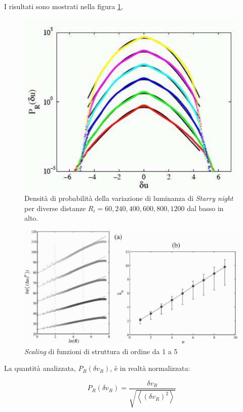 \documentclass[12pt,a4paper]{article}
\numberwithin{equation}{section}
\begin{document}
I risultati sono mostrati nella figura \ref{gaussians}, 

\begin{figure}[h]
    \centering
    \includegraphics[scale=0.5]{gauss.png}
    \caption{Densità di probabilità della variazione di luminanza di \emph{Starry night} per diverse distanze $R_i = 60, 240, 400, 600, 800, 1200$ dal basso in alto.}
    \label{gaussians}
\end{figure}

\begin{figure}
    \centering
    \includegraphics[scale=0.3]{scalingpower.png}
    \caption{\emph{Scaling} di funzioni di struttura di ordine da 1 a 5}
    \label{scalingpower}
\end{figure}

La quantità analizzata, $P_R(\delta v_R)$, è in realtà normalizzata:

\begin{equation}
P_R(\delta v_R)=
\frac{\delta v_R}{\sqrt{\left\langle
(\delta v_R )^2
\right\rangle}}
\end{equation}
\end{document}
